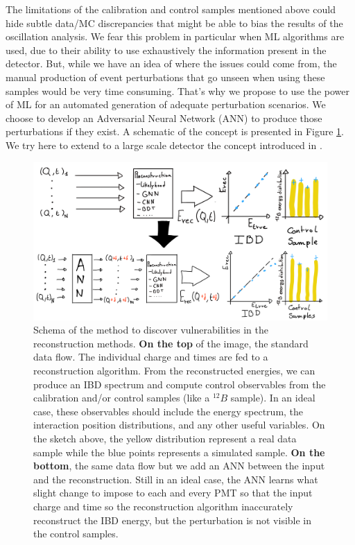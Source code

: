 \documentclass[../main.tex]{subfiles}
\begin{document}
The limitations of the calibration and control samples mentioned above could hide subtle data/MC discrepancies that might be able to bias the results of the oscillation analysis. We fear this problem in particular when ML algorithms are used, due to their ability to use exhaustively the information present in the detector.
But, while we have an idea of where the issues could come from, the manual production of event perturbations that go unseen when using these samples would be very time consuming. That's why we propose to use the power of ML for an automated generation of adequate perturbation scenarios. We choose to develop an Adversarial Neural Network (ANN) to produce those perturbations if they exist. A schematic of the concept is presented in Figure \ref{fig:janne:method:schema}. We try here to extend to a large scale detector the concept introduced in \cite{nachman_ai_2019}.

\begin{figure}[ht]
  \centering
  \includegraphics[width=\linewidth]{images/janne/ann_method.png}
  \caption{Schema of the method to discover vulnerabilities in the reconstruction methods. \textbf{On the top} of the image, the standard data flow. The individual charge and times are fed to a reconstruction algorithm. From the reconstructed energies, we can produce an IBD spectrum and compute control observables from the calibration and/or control samples (like a $^{12}B$ sample). In an ideal case, these observables should include the energy spectrum, the interaction position distributions, and any other useful variables. On the sketch above, the yellow distribution represent a real data sample while the blue points represents a simulated sample. \textbf{On the bottom}, the same data flow but we add an ANN between the input and the reconstruction. Still in an ideal case, the ANN learns what slight change to impose to each and every PMT so that the input charge and time so the reconstruction algorithm inaccurately reconstruct the IBD energy, but the perturbation is not visible in the control samples.}
  \label{fig:janne:method:schema}
\end{figure}
\end{document}
